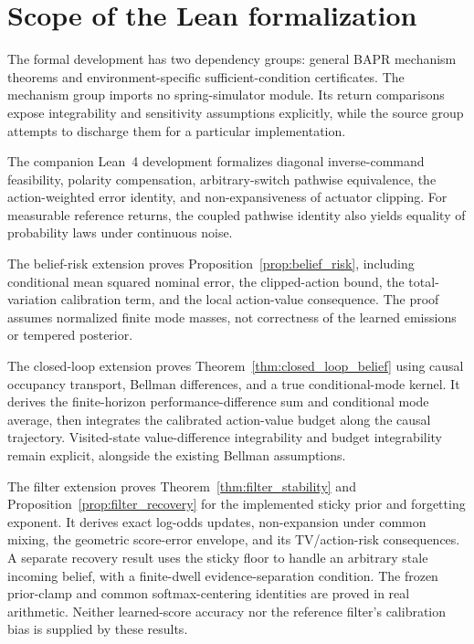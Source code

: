 \section{Scope of the Lean formalization}
\label{app:formalization_scope}

The formal development has two dependency groups: general BAPR mechanism theorems and environment-specific sufficient-condition certificates.
The mechanism group imports no spring-simulator module.
Its return comparisons expose integrability and sensitivity assumptions explicitly, while the source group attempts to discharge them for a particular implementation.

The companion Lean~4 development formalizes diagonal inverse-command feasibility, polarity compensation, arbitrary-switch pathwise equivalence, the action-weighted error identity, and non-expansiveness of actuator clipping. For measurable reference returns, the coupled pathwise identity also yields equality of probability laws under continuous noise.

The belief-risk extension proves Proposition~\ref{prop:belief_risk}, including conditional mean squared nominal error, the clipped-action bound, the total-variation calibration term, and the local action-value consequence.
The proof assumes normalized finite mode masses, not correctness of the learned emissions or tempered posterior.

The closed-loop extension proves Theorem~\ref{thm:closed_loop_belief} using causal occupancy transport, Bellman differences, and a true conditional-mode kernel.
It derives the finite-horizon performance-difference sum and conditional mode average, then integrates the calibrated action-value budget along the causal trajectory.
Visited-state value-difference integrability and budget integrability remain explicit, alongside the existing Bellman assumptions.

The filter extension proves Theorem~\ref{thm:filter_stability} and Proposition~\ref{prop:filter_recovery} for the implemented sticky prior and forgetting exponent.
It derives exact log-odds updates, non-expansion under common mixing, the geometric score-error envelope, and its TV/action-risk consequences.
A separate recovery result uses the sticky floor to handle an arbitrary stale incoming belief, with a finite-dwell evidence-separation condition.
The frozen prior-clamp and common softmax-centering identities are proved in real arithmetic.
Neither learned-score accuracy nor the reference filter's calibration bias is supplied by these results.

